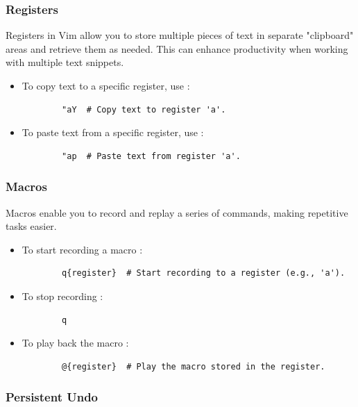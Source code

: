 \documentclass[12pt]{article}
\begin{document}
    \subsubsection*{Registers}

    Registers in Vim allow you to store multiple pieces of text in separate "clipboard" areas and retrieve them as needed. This can enhance productivity when working with multiple text snippets.

    \begin{itemize}
        \item To copy text to a specific register, use :
        \begin{lstlisting}
        "aY  # Copy text to register 'a'.
        \end{lstlisting}
        \item To paste text from a specific register, use :
        \begin{lstlisting}
        "ap  # Paste text from register 'a'.
        \end{lstlisting}
    \end{itemize}

    \subsubsection*{Macros}

    Macros enable you to record and replay a series of commands, making repetitive tasks easier.

    \begin{itemize}
        \item To start recording a macro :
        \begin{lstlisting}
        q{register}  # Start recording to a register (e.g., 'a').
        \end{lstlisting}
        \item To stop recording :
        \begin{lstlisting}
        q
        \end{lstlisting}
        \item To play back the macro :
        \begin{lstlisting}
        @{register}  # Play the macro stored in the register.
        \end{lstlisting}
    \end{itemize}

    \subsubsection*{Persistent Undo}
\end{document}
